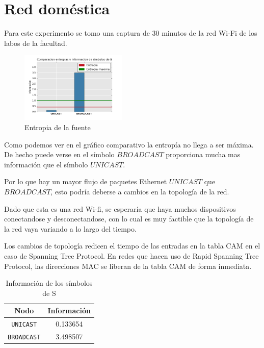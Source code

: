 \section{Red doméstica}

Para este experimento se tomo una captura de 30 minutos de la red Wi-Fi de los labos de la facultad.

\begin{figure}[h]
  \centering
    \includegraphics[width=0.45\textwidth]{grafico1-red-labos.png}
  \caption{Entropia de la fuente}
  \label{entropia-s}
\end{figure}

Como podemos ver en el gráfico comparativo la entropía no llega a ser máxima. De hecho puede verse en el símbolo $BROADCAST$ proporciona mucha mas información que el símbolo $UNICAST$. 

Por lo que hay un mayor flujo de paquetes Ethernet $UNICAST$ que $BROADCAST$, esto podría deberse a cambios en la topología de la red.

Dado que esta es una red Wi-fi, se esperaría que haya muchos dispositivos conectandose y desconectandose, con lo cual es muy factible que la topología de la red vaya variando a lo largo del tiempo.

Los cambios de topología redicen el tiempo de las entradas en la tabla CAM en el caso de Spanning Tree Protocol. En redes que hacen uso de Rapid Spanning Tree Protocol, las direcciones MAC se liberan de la tabla CAM de forma inmediata.


    \begin{table}[ht]\begin{center}
      \begin{tabular}{|c|c|}
      \hline
      \textbf{Nodo} & \textbf{Información} \\ \hline
      \texttt{UNICAST}& 0.133654 \\ \hline
      \texttt{BROADCAST}& 3.498507 \\ \hline
      \end{tabular}
      \caption{Información de los símbolos de S}
      \label{info-simbolos}
    \end{center}\end{table}


